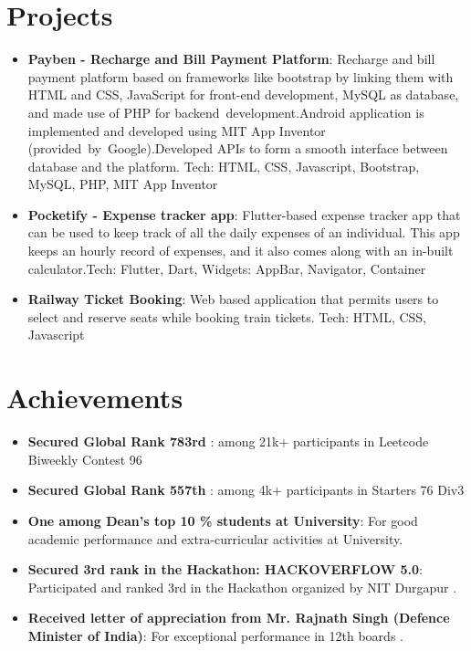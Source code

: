 \documentclass[a4paper,10pt]{article}
\def\color#1{}%
\newcommand{\resumeItem}[2]{
  \item\small{
    \textbf{#1}{: #2 \vspace{-2pt}}
  }
}
\newcommand{\resumeSubItem}[2]{\resumeItem{#1}{#2}\vspace{-3pt}}
\newcommand{\resumeSubHeadingListStart}{\begin{itemize}[leftmargin=*]}
\newcommand{\resumeSubHeadingListEnd}{\end{itemize}}
\begin{document}
\section{\color{BlueViolet} Projects}
\resumeSubHeadingListStart
\resumeItem{\color{Blue} Payben - Recharge and Bill Payment Platform}{Recharge and bill payment platform based on frameworks like bootstrap by linking them with HTML and CSS, JavaScript for front-end development, MySQL as database, and made use of PHP for backend development.\newline Android application is implemented and developed using MIT App Inventor (provided by Google).\newline Developed APIs to form a smooth interface between database and the platform.\newline
Tech: HTML, CSS, Javascript, Bootstrap, MySQL, PHP, MIT App Inventor}
\vspace{2pt}
\resumeSubItem{\color{Blue} Pocketify - Expense tracker app}{Flutter-based expense tracker app that can be used to keep track of all the daily expenses of an individual. This app keeps an hourly record of expenses, and it also comes along with an in-built calculator.\newline Tech: Flutter, Dart, Widgets: AppBar, Navigator, Container}
\vspace{2pt}
\resumeSubItem{\color{Blue} Railway Ticket Booking}{Web based application that permits users to select and reserve seats while booking train tickets.\newline
Tech: HTML, CSS, Javascript}
\vspace{2pt}
\resumeSubHeadingListEnd
\vspace{-5pt}

\section{\color{BlueViolet} Achievements}
\resumeSubHeadingListStart
\vspace{2pt}
\resumeSubItem{\color{Blue} Secured Global Rank 783rd }{\newline among 21k+ participants in Leetcode Biweekly Contest 96}
\vspace{2pt}
\resumeSubItem{\color{Blue} Secured Global Rank 557th }{\newline among 4k+ participants in Starters 76 Div3}
\vspace{2pt}
\resumeSubItem{\color{Blue} One among Dean's top 10 \% students at University}{\newline For good academic performance and extra-curricular activities at University.}
\vspace{2pt}
\resumeSubItem{\color{Blue} Secured 3rd rank in the Hackathon: HACKOVERFLOW 5.0}{\newline Participated and ranked 3rd in the Hackathon organized by NIT Durgapur .}
\vspace{2pt}
\resumeSubItem{\color{Blue} Received letter of appreciation from Mr. Rajnath Singh (Defence Minister of India)}{\newline For exceptional performance in 12th boards .}
\vspace{2pt}
\resumeSubHeadingListEnd
\vspace{-5pt}
\end{document}
